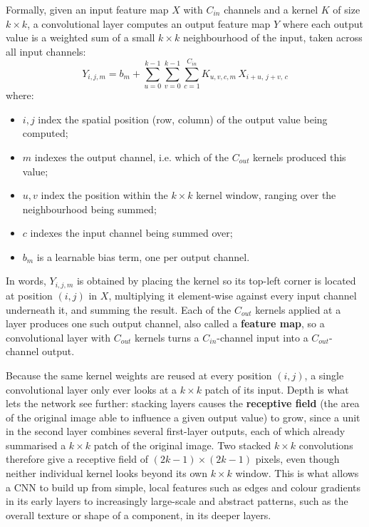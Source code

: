 Formally, given an input feature map $X$ with $C_{in}$ channels and a kernel $K$ of size $k \times k$, a convolutional layer computes an output feature map $Y$ where each output value is a weighted sum of a small $k \times k$ neighbourhood of the input, taken across all input channels:
\begin{equation}
Y_{i,j,m} = b_m + \sum_{u=0}^{k-1}\sum_{v=0}^{k-1}\sum_{c=1}^{C_{in}} K_{u,v,c,m}\,X_{i+u,\,j+v,\,c}
\label{eq:convolution}
\end{equation}
where:
\begin{itemize}
    \item $i, j$ index the spatial position (row, column) of the output value being computed;
    \item $m$ indexes the output channel, i.e. which of the $C_{out}$ kernels produced this value;
    \item $u, v$ index the position within the $k \times k$ kernel window, ranging over the neighbourhood being summed;
    \item $c$ indexes the input channel being summed over;
    \item $b_m$ is a learnable bias term, one per output channel.
\end{itemize}
In words, $Y_{i,j,m}$ is obtained by placing the kernel so its top-left corner is located at position $(i,j)$ in $X$, multiplying it element-wise against every input channel underneath it, and summing the result. Each of the $C_{out}$ kernels applied at a layer produces one such output channel, also called a \textbf{feature map}, so a convolutional layer with $C_{out}$ kernels turns a $C_{in}$-channel input into a $C_{out}$-channel output.

Because the same kernel weights are reused at every position $(i,j)$, a single convolutional layer only ever looks at a $k \times k$ patch of its input. Depth is what lets the network see further: stacking layers causes the \textbf{receptive field} (the area of the original image able to influence a given output value) to grow, since a unit in the second layer combines several first-layer outputs, each of which already summarised a $k \times k$ patch of the original image. Two stacked $k \times k$ convolutions therefore give a receptive field of $(2k-1)\times(2k-1)$ pixels, even though neither individual kernel looks beyond its own $k \times k$ window. This is what allows a CNN to build up from simple, local features such as edges and colour gradients in its early layers to increasingly large-scale and abstract patterns, such as the overall texture or shape of a component, in its deeper layers.


